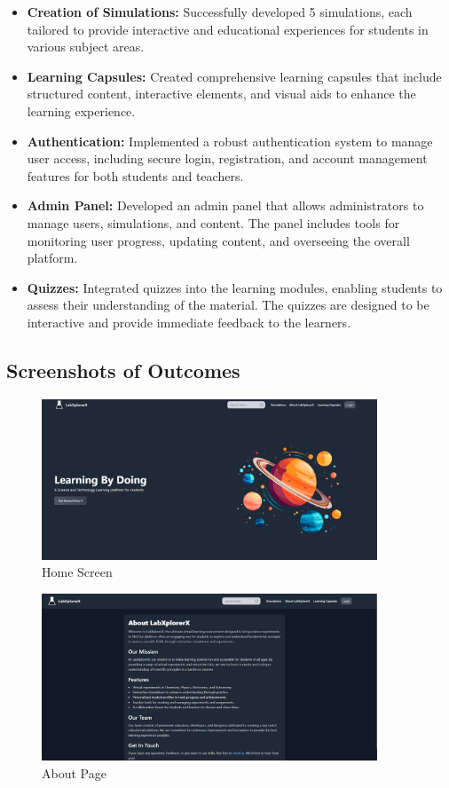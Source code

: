 \begin{itemize}[leftmargin=1cm]
    \item \textbf{Creation of Simulations:} Successfully developed 5 simulations, each tailored to provide interactive and educational experiences for students in various subject areas.
    
    \item \textbf{Learning Capsules:} Created comprehensive learning capsules that include structured content, interactive elements, and visual aids to enhance the learning experience.
    
    \item \textbf{Authentication:} Implemented a robust authentication system to manage user access, including secure login, registration, and account management features for both students and teachers.
    
    \item \textbf{Admin Panel:} Developed an admin panel that allows administrators to manage users, simulations, and content. The panel includes tools for monitoring user progress, updating content, and overseeing the overall platform.
    
    \item \textbf{Quizzes:} Integrated quizzes into the learning modules, enabling students to assess their understanding of the material. The quizzes are designed to be interactive and provide immediate feedback to the learners.
\end{itemize}
\subsection{Screenshots of Outcomes}
\begin{figure}[H]
    \centering
     \includegraphics[width = 10cm]{Diagrams/output/home.png}
     \caption{Home Screen}
 \end{figure}

 \begin{figure}[H]
    \centering
     \includegraphics[width = 10cm]{Diagrams/output/about.png}
     \caption{About Page}
 \end{figure}

